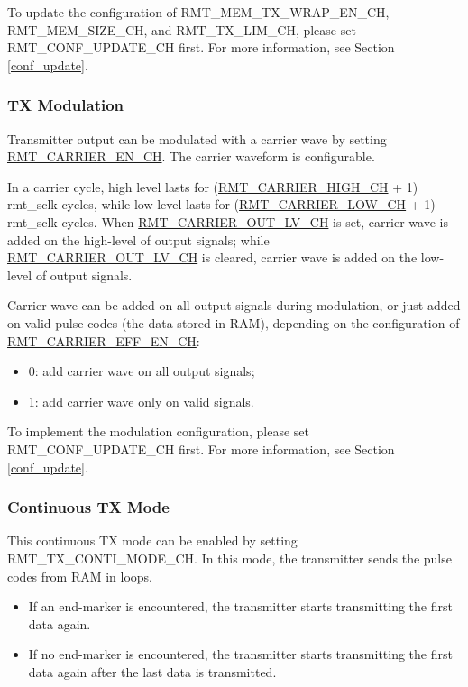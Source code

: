 \documentclass[main\_\_EN.tex]{subfiles}
\begin{document}
To update the configuration of RMT\_MEM\_TX\_WRAP\_EN\_CH, RMT\_MEM\_SIZE\_CH, and RMT\_TX\_LIM\_CH, please set RMT\_CONF\_UPDATE\_CH first. For more information, see Section \ref{conf_update}.

\subsubsection{TX Modulation}

Transmitter output can be modulated with a carrier wave by setting  \hyperref[fielddesc:RMTCARRIERENCHN]{RMT\_CARRIER\_EN\_CH}. The carrier waveform is configurable. 

In a carrier cycle, high level lasts for (\hyperref[fielddesc:RMTCARRIERHIGHCHN]{RMT\_CARRIER\_HIGH\_CH} + 1) rmt\_sclk cycles, while low level lasts for (\hyperref[fielddesc:RMTCARRIERLOWCHN]{RMT\_CARRIER\_LOW\_CH} + 1) rmt\_sclk cycles. When  \hyperref[fielddesc:RMTCARRIEROUTLVCHN]{RMT\_CARRIER\_OUT\_LV\_CH} is set, carrier wave is added on the high-level of output signals; while  \hyperref[fielddesc:RMTCARRIEROUTLVCHN]{RMT\_CARRIER\_OUT\_LV\_CH} is cleared, carrier wave is added on the low-level of output signals. 

Carrier wave can be added on all output signals during modulation, or just added on valid pulse codes (the data stored in RAM), depending on the configuration of \hyperref[fielddesc:RMTCARRIEREFFENCHN]{RMT\_CARRIER\_EFF\_EN\_CH}: 
\begin{itemize}
    \item 0: add carrier wave on all output signals;
    \item 1: add carrier wave only on valid signals.
\end{itemize}

To implement the modulation configuration, please set RMT\_CONF\_UPDATE\_CH first. For more information, see Section \ref{conf_update}.

\subsubsection{Continuous TX Mode}

This continuous TX mode can be enabled by setting RMT\_TX\_CONTI\_MODE\_CH. In this mode, the transmitter sends the pulse codes from RAM in loops. 
\begin{itemize}
    \item If an end-marker is encountered, the transmitter starts transmitting the first data again. 
    \item If no end-marker is encountered, the transmitter starts transmitting the first data again after the last data is transmitted.
\end{itemize}
\end{document}
